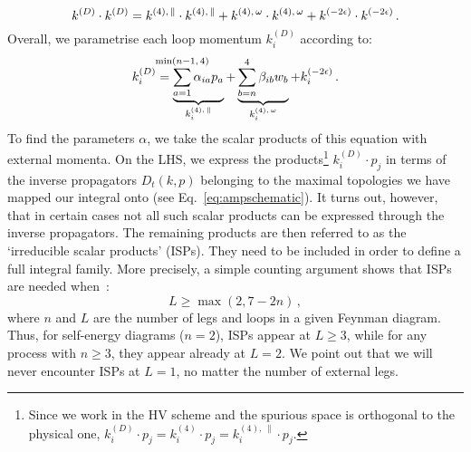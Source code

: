 \documentclass[main.tex]{subfiles}
\begin{document}
\begin{equation} \label{eq:ksquared}
    k^{(D)} \cdot k^{(D)}  = k^{(4),\, \parallel} \cdot k^{(4),\, \parallel} + k^{(4),\, \omega} \cdot k^{(4),\, \omega} + k^{(-2\epsilon)} \cdot k^{(-2\epsilon)}\,.
\end{equation}
Overall, we parametrise each loop momentum $k_i^{(D)}$ according to:
\begin{equation} \label{eq:kdecomposition}
    k_i^{(D)} = \underbrace{\sum_{a=1}^{\mathclap{\min(n-1,\, 4)}} \alpha_{ia} p_a}_{k_i^{(4),\,\parallel}} + \underbrace{\sum_{b=n}^{4} \beta_{ib} w_b}_{k_i^{(4),\,\omega}} + k_i^{(-2\eps)}\,.
\end{equation}
To find the parameters $\alpha$, we take the scalar products of this equation with external momenta. On the LHS, we express the products\footnote{Since we work in the HV scheme and the spurious space is orthogonal to the physical one, $k_i^{(D)} \cdot p_j = k_i^{(4)} \cdot p_j = k_i^{(4),\,\parallel} \cdot p_j$.} $k_i^{(D)} \cdot p_j$ in terms of the inverse propagators $D_t(k,p)$ belonging to the maximal topologies we have mapped our integral onto (see Eq.~\ref{eq:ampschematic}). It turns out, however, that in certain cases not all such scalar products can be expressed through the inverse propagators. The remaining products are then referred to as the `irreducible scalar products' (ISPs). They need to be included in order to define a full integral family. More precisely, a simple counting argument shows that ISPs are needed when~\cite{grozin:2011mt}:
\begin{equation} \label{eq:ISPcondition}
    L \ge \max (2, 7-2n)\,,
\end{equation}
where $n$ and $L$ are the number of legs and loops in a given Feynman diagram. Thus, for self-energy diagrams ($n=2$), ISPs appear at $L\ge3$, while for any process with $n\ge3$, they appear already at $L=2$. We point out that we will never encounter ISPs at $L=1$, no matter the number of external legs.
\end{document}
